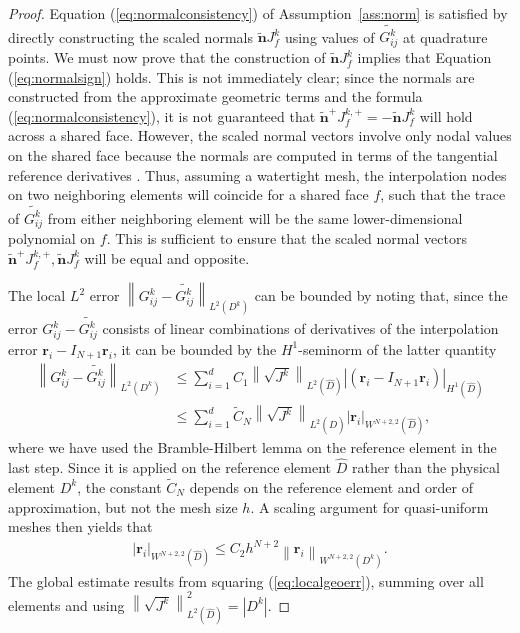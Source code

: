 \documentclass[10pt]{amsart}
\theoremstyle{definition}
\theoremstyle{lemma}
\theoremstyle{theorem}
\theoremstyle{assumption}
\renewcommand{\hat}{\widehat}
\renewcommand{\tilde}{\widetilde}
\newcommand{\nor}[1]{\left\| #1 \right\|}
\newcommand{\LRp}[1]{\left( #1 \right)}
\newcommand{\LRb}[1]{\left| #1 \right|}
\newcommand{\Grad} {\ensuremath{\nabla}}
\begin{document}
{\begin{proof}
Equation (\ref{eq:normalconsistency}) of Assumption~\ref{ass:norm} is satisfied by directly constructing the scaled normals $\tilde{\bm{n}}J^k_f$ using values of $\tilde{G^k_{ij}}$ at quadrature points.  We must now prove that the construction of $\tilde{\bm{n}}J^k_f$ implies that Equation (\ref{eq:normalsign}) holds. This is not immediately clear; since the normals are constructed from the approximate geometric terms and the formula (\ref{eq:normalconsistency}), it is not guaranteed that $\tilde{\bm{n}}^+J^{k,+}_f = -\tilde{\bm{n}}J^k_f$ will hold across a shared face.  However, the scaled normal vectors involve only nodal values on the shared face because the normals are computed in terms of the tangential reference derivatives \cite{kopriva2006metric}.  Thus, assuming a watertight mesh, the interpolation nodes on two neighboring elements will coincide for a shared face $f$, such that the trace of $\tilde{G^k_{ij}}$ from either neighboring element will be the same lower-dimensional polynomial on $f$.  This is sufficient to ensure that the scaled normal vectors $\tilde{\bm{n}}^+J^{k,+}_f, \tilde{\bm{n}}J^k_f$ will be equal and opposite.  

The local $L^2$ error $\nor{{G^k_{ij}}-\tilde{G^k_{ij}}}_{L^2\LRp{D^k}}$ can be bounded by noting that, since the error $G^k_{ij}-\tilde{G^k_{ij}}$ consists of linear combinations of derivatives of the interpolation error $\bm{r}_i-I_{N+1}\bm{r}_i$, it can be bounded by the $H^1$-seminorm of the latter quantity
\begin{align*}
\nor{{G^k_{ij}}-\tilde{G^k_{ij}}}_{L^2\LRp{D^k}} &\leq %
 \sum_{i=1}^d C_1 \nor{\sqrt{J^k}}_{L^2\LRp{\hat{D}}} \LRb{\LRp{\bm{r}_i-I_{N+1}\bm{r}_i}}_{H^1\LRp{\hat{D}}}\\
 &\leq  \sum_{i=1}^d \tilde{C}_N \nor{\sqrt{J^k}}_{L^2\LRp{\hat{D}}} \LRb{\bm{r}_i}_{W^{N+2,2}\LRp{\hat{D}}},
\end{align*}
where we have used the Bramble-Hilbert lemma \cite{brenner2007mathematical} on the reference element in the last step.  Since it is applied on the reference element $\hat{D}$ rather than the physical element $D^k$, the constant $\tilde{C}_N$ depends on the reference element and order of approximation, but not the mesh size $h$.  A scaling argument for quasi-uniform meshes then yields that
\begin{align}
\LRb{\bm{r}_i}_{W^{N+2,2}\LRp{\hat{D}}} \leq C_2 h^{N+2}\nor{\bm{r}_i}_{W^{N+2,2}\LRp{D^k}}.
\label{eq:localgeoerr}
\end{align}
The global estimate results from squaring (\ref{eq:localgeoerr}), summing over all elements and using $\nor{\sqrt{J^k}}^2_{L^2\LRp{\hat{D}}} = \LRb{D^k}$.
\end{proof}

}
\end{document}
